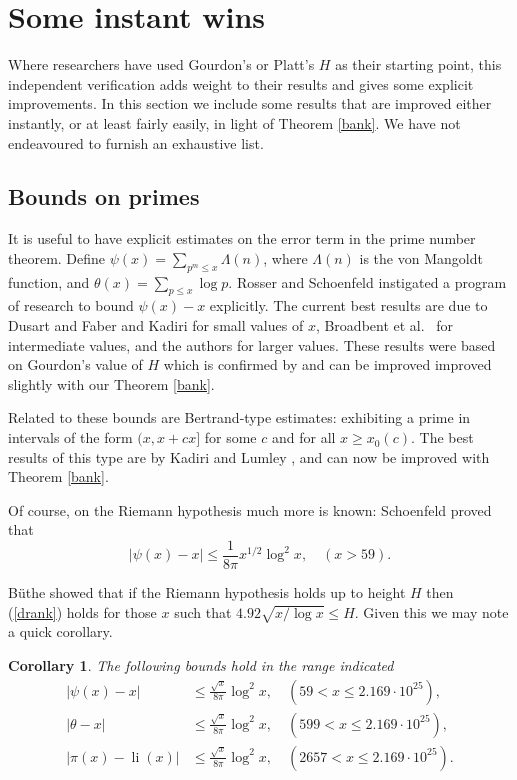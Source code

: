 \documentclass[12pt]{article}
\newtheorem{cor}{Corollary}
\DeclareMathOperator{\li}{li}
\begin{document}
\section{Some instant wins}\label{dank}
%
Where researchers have used Gourdon's or Platt's $H$ as their starting point, this independent verification adds weight to their results and gives some explicit improvements.
In this section we include some results that are improved either instantly, or at least fairly easily, in light of Theorem \ref{bank}. We have not endeavoured to furnish an exhaustive list.

\subsection{Bounds on primes}

It is useful to have explicit estimates on the error term in the prime number theorem. Define $\psi(x) = \sum_{p^{m}\leq x} \Lambda(n)$, where $\Lambda(n)$ is the von Mangoldt function, and $\theta(x) = \sum_{p\leq x} \log p$. Rosser and Schoenfeld \cite{Ross} instigated a program of research to bound $\psi(x) -x$ explicitly. The current best results are due to Dusart \cite{Dusart} and Faber and Kadiri \cite{Faber_fix} for small values of $x$, Broadbent et al.\  \cite{Broadbent} for intermediate values,  and the authors \cite{PTnow} for larger values. These results were based on Gourdon's value of $H$ which is confirmed by and can be improved improved slightly with our Theorem \ref{bank}. 

Related to these bounds are Bertrand-type estimates: exhibiting a prime in intervals of the form $(x, x+ cx]$ for some $c$ and for all $x\geq x_{0}(c)$. The best results of this type are by Kadiri and Lumley \cite{KL}, and can now be improved with Theorem \ref{bank}.

Of course, on the Riemann hypothesis much more is known: Schoenfeld \cite{Sock} proved that
\begin{equation}\label{drank}
|\psi(x) -x| \leq \frac{1}{8\pi} x^{1/2} \log^{2} x, \quad (x > 59).
\end{equation}

B\"{u}the \cite[\S 7]{Booth} showed that if the Riemann hypothesis holds up to height $H$ then (\ref{drank}) holds for those $x$ such that $4.92\sqrt{x/\log x} \leq H$. Given this we may note a quick corollary.
\begin{cor}
The following bounds hold in the range indicated
\begin{equation*}
\begin{split}
|\psi(x) - x| &\leq \frac{\sqrt{x}}{8\pi} \log^{2} x, \quad (59<x\leq2.169\cdot 10^{25}),\\
|\theta - x| &\leq \frac{\sqrt{x}}{8\pi} \log^{2} x, \quad (599<x\leq2.169\cdot 10^{25}),\\
|\pi(x) - \li(x)| &\leq \frac{\sqrt{x}}{8\pi} \log^{2} x, \quad (2657<x\leq2.169\cdot 10^{25}).\\
\end{split}
\end{equation*}
\end{cor}
\end{document}

